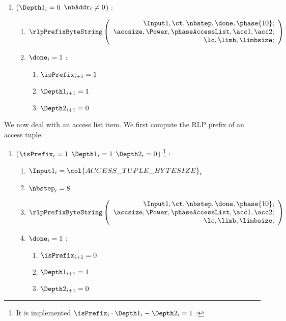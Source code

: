 \begin{enumerate}[resume]
	\item \If ($\Depth 1_{i}=0$ \et $\nbAddr_{i} \neq 0$) \Then:
	\begin{enumerate}
	    \item 
			\[
				\rlpPrefixByteString
				\left( \begin{array}{r}
					\Input1,
					\ct,
					\nbstep,
					\done,
					\phase{10}; \\
					\accsize,
					\Power,
					\phaseAccessList,
					\acc1,
					\acc2; \\
					\lc,
					\limb,
					\limbsize; \\
				\end{array} \right)
			\]
	     \item \If $\done_{i}=1$ \Then:
	     \begin{enumerate} 
		 	\item $\isPrefix_{i+1}=1$
		 	\item $\Depth1_{i+1}=1$
		 	\item $\Depth2_{i+1}=0$	
	     \end{enumerate}
	\end{enumerate}
\end{enumerate}
We now deal with an access list item. We first compute the RLP prefix of an access tuple:
\begin{enumerate}[resume]
	\item \If ($\isPrefix_{i}=1$ \et $\Depth1_{i}=1$ \et $\Depth2_{i}=0$) \footnote{It is implemented \If $\isPrefix_{i} \cdot \Depth1_{i} - \Depth2_{i}=1$ \Then:} \Then:
	\begin{enumerate}
		\item $\Input1_{i} = \col{ACCESS\_TUPLE\_BYTESIZE}_{i}$
		\item $\nbstep_{i}=8$
		\item 
			\[
				\rlpPrefixByteString
				\left( \begin{array}{r}
					\Input1,
					\ct,
					\nbstep,
					\done,
					\phase{10}; \\
					\accsize,
					\Power,
					\phaseAccessList,
					\acc1,
					\acc2; \\
					\lc,
					\limb,
					\limbsize; \\
				\end{array} \right)
			\]
		\item \If $\done_{i}=1$ \Then:
		\begin{enumerate}
		 	\item $\isPrefix_{i+1}=0$
		 	\item $\Depth1_{i+1}=1$
		 	\item $\Depth2_{i+1}=0$ 
		\end{enumerate}
	\end{enumerate}
\end{enumerate}
